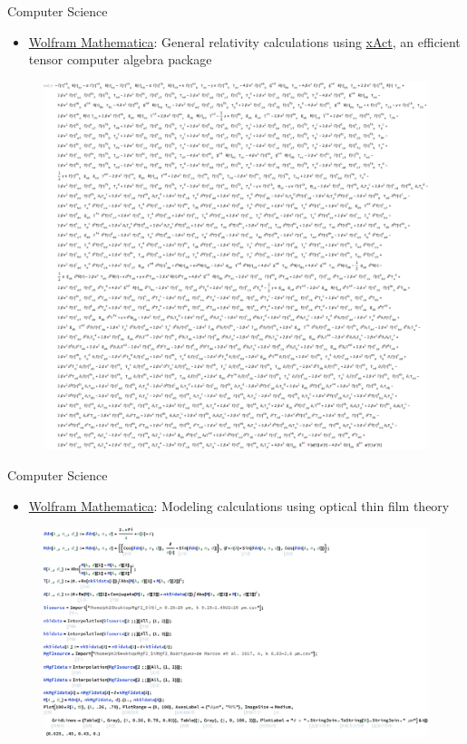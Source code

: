\documentclass[9pt,aspectratio=169,hyperref=colorlinks]{beamer}
\begin{document}
\begin{frame}{Computer Science}
    \begin{itemize}
        \item \href{https://www.wolfram.com/mathematica/}{Wolfram Mathematica}: General relativity calculations using \href{http://xact.es/index.html}{xAct}, an efficient tensor computer algebra package
    \end{itemize}

    \begin{figure}
        \centering
        \includegraphics[scale=0.32]{CV/figs/2211.13233.2.pdf}
    \end{figure}
\end{frame}

\begin{frame}{Computer Science}
    \begin{itemize}
        \item \href{https://www.wolfram.com/mathematica/}{Wolfram Mathematica}: Modeling calculations using optical thin film theory
    \end{itemize}

    \begin{figure}
        \centering
        \includegraphics[scale=0.31]{CV/figs/3.1.pdf}
    \end{figure}
\end{frame}
\end{document}
